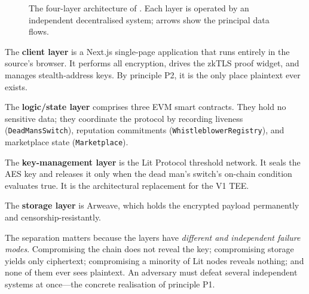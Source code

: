 \begin{figure}[htbp]
\caption{The four-layer architecture of \zkwns. Each layer is operated by an
independent decentralised system; arrows show the principal data flows.}
\label{fig:arch-layers}
\end{figure}

The \textbf{client layer} is a Next.js single-page application that runs entirely
in the source's browser. It performs all encryption, drives the zkTLS proof
widget, and manages stealth-address keys. By principle P2, it is the only place
plaintext ever exists.

The \textbf{logic/state layer} comprises three EVM smart contracts. They hold no
sensitive data; they coordinate the protocol by recording liveness
(\texttt{DeadMansSwitch}), reputation commitments
(\texttt{WhistleblowerRegistry}), and marketplace state (\texttt{Marketplace}).

The \textbf{key-management layer} is the Lit Protocol threshold network. It seals
the AES key and releases it only when the dead man's switch's on-chain condition
evaluates true. It is the architectural replacement for the V1 TEE.

The \textbf{storage layer} is Arweave, which holds the encrypted payload
permanently and censorship-resistantly.

The separation matters because the layers have \emph{different and independent
failure modes}. Compromising the chain does not reveal the key; compromising
storage yields only ciphertext; compromising a minority of Lit nodes reveals
nothing; and none of them ever sees plaintext. An adversary must defeat several
independent systems at once---the concrete realisation of principle P1.


